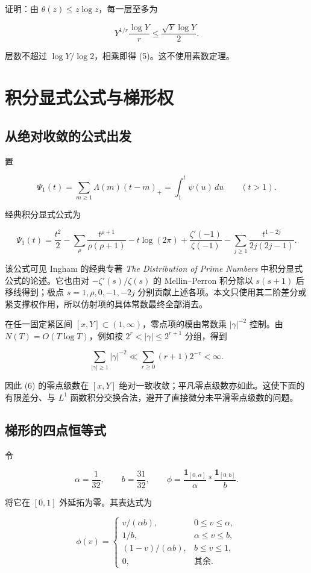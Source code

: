 \documentclass[UTF8,zihao=-4,fontset=fandol]{ctexart}
\begin{document}
证明：由 \(\theta(z)\le z\log z\)，每一层至多为

\[
Y^{1/r}\frac{\log Y}{r}\le\frac{\sqrt Y\log Y}{2}.
\]

层数不超过 \(\log Y/\log2\)，相乘即得 (5)。这不使用素数定理。

\section{积分显式公式与梯形权}

\subsection{从绝对收敛的公式出发}

置

\[
\Psi_1(t)=\sum_{m\ge1}\Lambda(m)(t-m)_+
=\int_1^t\psi(u)\,du\qquad(t>1).
\]

经典积分显式公式为

\[
\Psi_1(t)=\frac{t^2}{2}
-\sum_\rho\frac{t^{\rho+1}}{\rho(\rho+1)}
-t\log(2\pi)+\frac{\zeta'(-1)}{\zeta(-1)}
-\sum_{j\ge1}\frac{t^{1-2j}}{2j(2j-1)}. \tag{6}
\]

该公式可见 Ingham 的经典专著 \emph{The Distribution of Prime Numbers} 中积分显式公式的论述。它也由对 \(-\zeta'(s)/\zeta(s)\) 的 Mellin–Perron 积分除以 \(s(s+1)\) 后移线得到；极点 \(s=1,\rho,0,-1,-2j\) 分别贡献上述各项。本文只使用其二阶差分或紧支撑权作用，所以仿射项的具体常数最终全部消去。

在任一固定紧区间 \([x,Y]\subset(1,\infty)\)，零点项的模由常数乘 \(|\gamma|^{-2}\) 控制。由 \(N(T)=O(T\log T)\)，例如按 \(2^r<|\gamma|\le2^{r+1}\) 分组，得到

\[
\sum_{|\gamma|\ge1}|\gamma|^{-2}
\ll\sum_{r\ge0}(r+1)2^{-r}<\infty.
\]

因此 (6) 的零点级数在 \([x,Y]\) 绝对一致收敛；平凡零点级数亦如此。这使下面的有限差分、与 \(L^1\) 函数积分交换合法，避开了直接微分未平滑零点级数的问题。

\subsection{梯形的四点恒等式}

令

\[
\alpha=\frac1{32},\qquad b=\frac{31}{32},\qquad
\phi=\frac{\mathbf1_{[0,\alpha]}}{\alpha}
*\frac{\mathbf1_{[0,b]}}b.
\]

将它在 \([0,1]\) 外延拓为零。其表达式为

\[
\phi(v)=
\begin{cases}
v/(\alpha b),&0\le v\le\alpha,\\
1/b,&\alpha\le v\le b,\\
(1-v)/(\alpha b),&b\le v\le1,\\
0,&\text{其余}.
\end{cases}
\]
\end{document}
